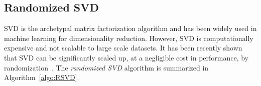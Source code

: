 




%

\subsection{Randomized SVD}
SVD is the archetypal matrix factorization algorithm and has been widely used in machine learning for dimensionality reduction. However, SVD is computationally expensive and not scalable to large scale datasets. It has been recently shown that SVD can be significantly scaled up, at a negligible cost in performance, by randomization~\citep{halko2011}. The \textsl{randomized SVD} algorithm is summarized in Algorithm~\ref{algo:RSVD}.

